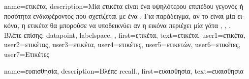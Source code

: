 {name={\foreignlanguage{greek}{ετικέτα}},
	description={\foreignlanguage{greek}{Μία ετικέτα είναι ένα υψηλότερου επιπέδου γεγονός ή ποσότητα 
		ενδιαφέροντος} \foreignlanguage{greek}{που σχετίζεται με ένα} 
		. \foreignlanguage{greek}{Για παράδειγμα, αν το}  
		\foreignlanguage{greek}{είναι μία εικόνα, η ετικέτα θα μπορούσε να υποδεικνύει αν η εικόνα περιέχει 
		μία γάτα} \cite{Everitt2022}, \cite{Gujarati2021}, \cite{Dodge2003}.
		\\
		\foreignlanguage{greek}{Βλέπε επίσης:} \gls{datapoint}, \gls{labelspace}. },
	first={\foreignlanguage{greek}{ετικέτα}},
	text={\foreignlanguage{greek}{ετικέτα}},
	user1={\foreignlanguage{greek}{ετικέτα}}, %
  	user2={\foreignlanguage{greek}{ετικέτας}}, %
	user3={\foreignlanguage{greek}{ετικέτα}}, %
	user4={\foreignlanguage{greek}{ετικέτες}}, %
  	user5={\foreignlanguage{greek}{ετικετών}}, %
	user6={\foreignlanguage{greek}{ετικέτες}}, %
	user7={\foreignlanguage{greek}{Ετικέτες}} %
}

{name={\foreignlanguage{greek}{ευαισθησία}}, 
	description={\foreignlanguage{greek}{Βλέπε} \gls{recall}.},
	first={\foreignlanguage{greek}{ευαισθησία}}, 
	text={\foreignlanguage{greek}{ευαισθησία}}
}

